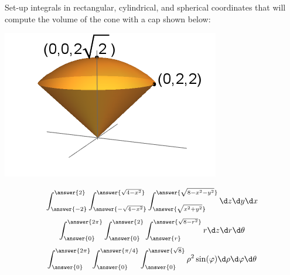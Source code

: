 \documentclass{ximera}
\author{Bart Snapp}
\begin{document}
\begin{exercise}
  Set-up integrals in rectangular, cylindrical, and spherical
  coordinates that will compute the volume of the cone with a cap shown below:
  \begin{image}
    \includegraphics{coneWithCap1.png}
  \end{image}
  \begin{prompt}
  \[
  \int_{\answer{-2}}^{\answer{2}}\int_{\answer{-\sqrt{4-x^2}}}^{\answer{\sqrt{4-x^2}}}\int_{\answer{\sqrt{x^2+y^2}}}^{\answer{\sqrt{8-x^2-y^2}}}\d z \d y \d x
  \]
  \[
  \int_{\answer{0}}^{\answer{2\pi}}\int_{\answer{0}}^{\answer{2}}\int_{\answer{r}}^{\answer{\sqrt{8-r^2}}}   r\d z \d r \d \theta
  \]
  \[
  \int_{\answer{0}}^{\answer{2\pi}}\int_{\answer{0}}^{\answer{\pi/4}}\int_{\answer{0}}^{\answer{\sqrt{8}}}   \rho^2\sin(\varphi)\d \rho \d \varphi \d \theta
  \]
  \end{prompt}
\end{exercise}
\end{document}
